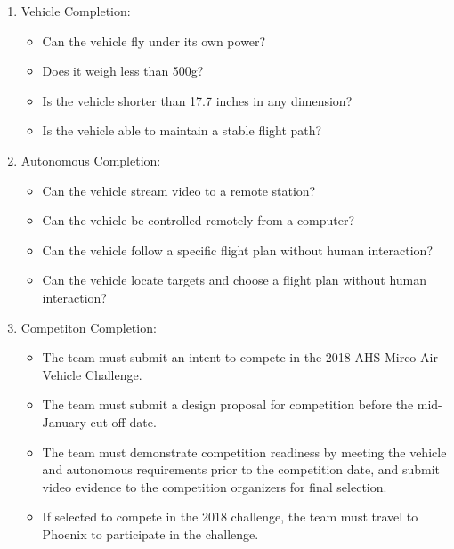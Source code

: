 \documentclass[10pt,letterpaper,onecolumn]{article}
\begin{document}
\begin{enumerate}
\item Vehicle Completion:
\begin{itemize}
\item Can the vehicle fly under its own power?
\item Does it weigh less than 500g?
\item Is the vehicle shorter than 17.7 inches in any dimension?
\item Is the vehicle able to maintain a stable flight path?
\end{itemize}
\item Autonomous Completion:
\begin{itemize}
\item Can the vehicle stream video to a remote station?
\item Can the vehicle be controlled remotely from a computer?
\item Can the vehicle follow a specific flight plan without human interaction?
\item Can the vehicle locate targets and choose a flight plan without human
interaction?
\end{itemize}
\item Competiton Completion:
\begin{itemize}
\item The team must submit an intent to compete in the 2018 AHS Mirco-Air Vehicle 
Challenge.
\item The team must submit a design proposal for competition before the mid-
January cut-off date. 
\item The team must demonstrate competition readiness by meeting the vehicle and 
autonomous requirements prior to the competition date, and submit video evidence 
to the competition organizers for final selection.
\item If selected to compete in the 2018 challenge, the team must travel to 
Phoenix to participate in the challenge. 
\end{itemize}
\end{enumerate}
\end{document}
